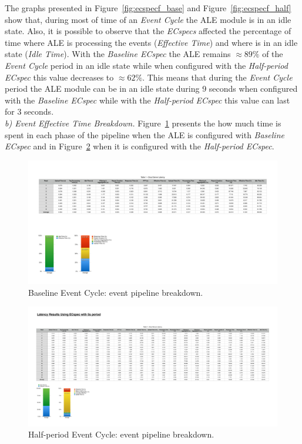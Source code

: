 The graphs presented in Figure~\ref{fig:ecspecf_base} and Figure~\ref{fig:ecspecf_half} show that,
during most of time of an \textit{Event Cycle} the \gls{ALE} module is in an idle state.
Also, it is possible to observe that the \textit{ECspecs} affected the percentage of time where
\gls{ALE} is processing the events (\textit{Effective Time}) and where is in an idle state (\textit{Idle Time}).
With the \textit{Baseline ECspec} the \gls{ALE} remains $\approx89\%$ of the \textit{Event Cycle} period
in an idle state while when configured with the \textit{Half-period ECspec} this value decreases to
$\approx62\%$. This means that during the \textit{Event Cycle} period the \gls{ALE} module can be in
an idle state during 9 seconds when configured with the \textit{Baseline ECspec} while with the
\textit{Half-period ECspec} this value can last for 3 seconds.\\

\textit{b) Event Effective Time Breakdown.}
Figure~\ref{fig:ecspecf_effective_base} presents the how much time is spent in each phase of
the pipeline when the \gls{ALE} is configured with \textit{Baseline ECspec} and in
Figure~\ref{fig:ecspecf_effective_half} when it is configured with the \textit{Half-period ECspec}.\\

\begin{figure}[ht!]
  \centering
  \includegraphics[width=.7\linewidth]{./figures/cloud_ecspec_effective_breakdown}
  \caption{Baseline Event Cycle: event pipeline breakdown.}
  \label{fig:ecspecf_effective_base}
\end{figure}

\begin{figure}[ht!]
  \centering
  \includegraphics[width=.7\linewidth]{./figures/cloud_ecspecf_effective_breakdown}
  \caption{Half-period Event Cycle: event pipeline breakdown.}
  \label{fig:ecspecf_effective_half}
\end{figure}

